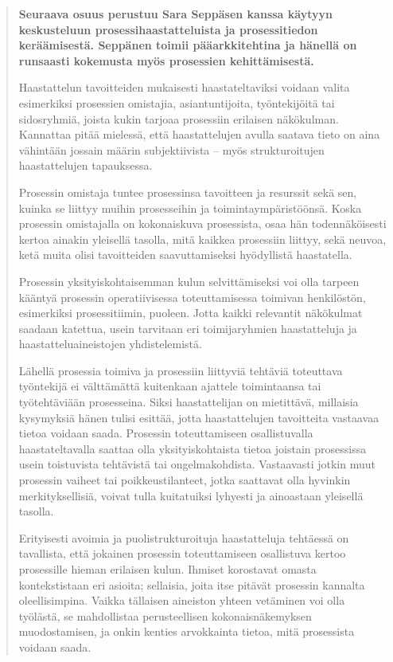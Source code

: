 \documentclass[
  finnish,
  letterpaper,
  DIV=11,
  numbers=noendperiod,
  oneside]{scrreprt}
\begin{document}
\begin{quote}
\textbf{Seuraava osuus perustuu Sara Seppäsen kanssa käytyyn
keskusteluun prosessihaastatteluista ja prosessitiedon keräämisestä.
Seppänen toimii pääarkkitehtina ja hänellä on runsaasti kokemusta myös
prosessien kehittämisestä.}

Haastattelun tavoitteiden mukaisesti haastateltaviksi voidaan valita
esimerkiksi prosessien omistajia, asiantuntijoita, työntekijöitä tai
sidosryhmiä, joista kukin tarjoaa prosessiin erilaisen näkökulman.
Kannattaa pitää mielessä, että haastattelujen avulla saatava tieto on
aina vähintään jossain määrin subjektiivista -- myös strukturoitujen
haastattelujen tapauksessa.

Prosessin omistaja tuntee prosessinsa tavoitteen ja resurssit sekä sen,
kuinka se liittyy muihin prosesseihin ja toimintaympäristöönsä. Koska
prosessin omistajalla on kokonaiskuva prosessista, osaa hän
todennäköisesti kertoa ainakin yleisellä tasolla, mitä kaikkea
prosessiin liittyy, sekä neuvoa, ketä muita olisi tavoitteiden
saavuttamiseksi hyödyllistä haastatella.

Prosessin yksityiskohtaisemman kulun selvittämiseksi voi olla tarpeen
kääntyä prosessin operatiivisessa toteuttamisessa toimivan henkilöstön,
esimerkiksi prosessitiimin, puoleen. Jotta kaikki relevantit näkökulmat
saadaan katettua, usein tarvitaan eri toimijaryhmien haastatteluja ja
haastatteluaineistojen yhdistelemistä.

Lähellä prosessia toimiva ja prosessiin liittyviä tehtäviä toteuttava
työntekijä ei välttämättä kuitenkaan ajattele toimintaansa tai
työtehtäviään prosesseina.
Siksi haastattelijan on mietittävä, millaisia kysymyksiä hänen tulisi
esittää, jotta haastattelujen tavoitteita vastaavaa tietoa voidaan
saada. Prosessin toteuttamiseen osallistuvalla haastateltavalla saattaa
olla yksityiskohtaista tietoa joistain prosessissa usein toistuvista
tehtävistä tai ongelmakohdista. Vastaavasti jotkin muut prosessin
vaiheet tai poikkeustilanteet, jotka saattavat olla hyvinkin
merkityksellisiä, voivat tulla kuitatuiksi lyhyesti ja ainoastaan
yleisellä tasolla.

Erityisesti avoimia ja puolistrukturoituja haastatteluja tehtäessä on
tavallista, että jokainen prosessin toteuttamiseen osallistuva kertoo
prosessille hieman erilaisen kulun. Ihmiset korostavat omasta
kontekstistaan eri asioita; sellaisia, joita itse pitävät prosessin
kannalta oleellisimpina. Vaikka tällaisen aineiston yhteen vetäminen voi
olla työlästä, se mahdollistaa perusteellisen kokonaisnäkemyksen
muodostamisen, ja onkin kenties arvokkainta tietoa, mitä prosessista
voidaan saada.


\end{quote}
\end{document}
